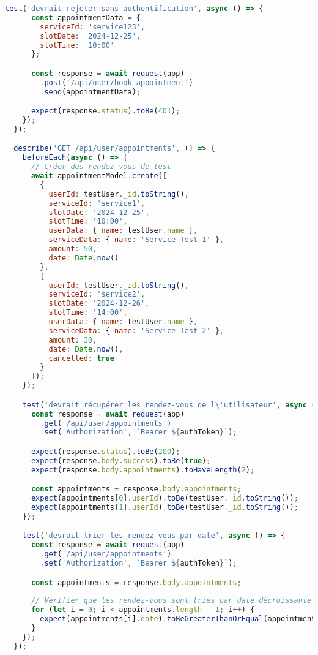 \begin{lstlisting}[language=JavaScript, caption=appointmentService.integration.test.js]
    test('devrait rejeter sans authentification', async () => {
      const appointmentData = {
        serviceId: 'service123',
        slotDate: '2024-12-25',
        slotTime: '10:00'
      };

      const response = await request(app)
        .post('/api/user/book-appointment')
        .send(appointmentData);

      expect(response.status).toBe(401);
    });
  });

  describe('GET /api/user/appointments', () => {
    beforeEach(async () => {
      // Créer des rendez-vous de test
      await appointmentModel.create([
        {
          userId: testUser._id.toString(),
          serviceId: 'service1',
          slotDate: '2024-12-25',
          slotTime: '10:00',
          userData: { name: testUser.name },
          serviceData: { name: 'Service Test 1' },
          amount: 50,
          date: Date.now()
        },
        {
          userId: testUser._id.toString(),
          serviceId: 'service2',
          slotDate: '2024-12-26',
          slotTime: '14:00',
          userData: { name: testUser.name },
          serviceData: { name: 'Service Test 2' },
          amount: 30,
          date: Date.now(),
          cancelled: true
        }
      ]);
    });

    test('devrait récupérer les rendez-vous de l\'utilisateur', async () => {
      const response = await request(app)
        .get('/api/user/appointments')
        .set('Authorization', `Bearer ${authToken}`);

      expect(response.status).toBe(200);
      expect(response.body.success).toBe(true);
      expect(response.body.appointments).toHaveLength(2);

      const appointments = response.body.appointments;
      expect(appointments[0].userId).toBe(testUser._id.toString());
      expect(appointments[1].userId).toBe(testUser._id.toString());
    });

    test('devrait trier les rendez-vous par date', async () => {
      const response = await request(app)
        .get('/api/user/appointments')
        .set('Authorization', `Bearer ${authToken}`);

      const appointments = response.body.appointments;
      
      // Vérifier que les rendez-vous sont triés par date décroissante
      for (let i = 0; i < appointments.length - 1; i++) {
        expect(appointments[i].date).toBeGreaterThanOrEqual(appointments[i + 1].date);
      }
    });
  });


\end{lstlisting}
